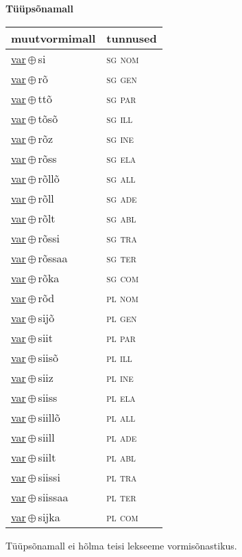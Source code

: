 

\vspace{3.5em}
\noindent \begin{minipage}{\textwidth}
\noindent \textbf{Tüüpsõnamall \,}\\

\begin{sideways}
\begin{tabular}{l l}
muutvormimall & tunnused \\
\hline
\underline{var}\,$\oplus$\,si & \textsc{ sg nom } \\
\underline{var}\,$\oplus$\,rõ & \textsc{ sg gen } \\
\underline{var}\,$\oplus$\,ttõ & \textsc{ sg par } \\
\underline{var}\,$\oplus$\,tõsõ & \textsc{ sg ill } \\
\underline{var}\,$\oplus$\,rõz & \textsc{ sg ine } \\
\underline{var}\,$\oplus$\,rõss & \textsc{ sg ela } \\
\underline{var}\,$\oplus$\,rõllõ & \textsc{ sg all } \\
\underline{var}\,$\oplus$\,rõll & \textsc{ sg ade } \\
\underline{var}\,$\oplus$\,rõlt & \textsc{ sg abl } \\
\underline{var}\,$\oplus$\,rõssi & \textsc{ sg tra } \\
\underline{var}\,$\oplus$\,rõssaa & \textsc{ sg ter } \\
\underline{var}\,$\oplus$\,rõka & \textsc{ sg com } \\
\underline{var}\,$\oplus$\,rõd & \textsc{ pl nom } \\
\underline{var}\,$\oplus$\,sijõ & \textsc{ pl gen } \\
\underline{var}\,$\oplus$\,siit & \textsc{ pl par } \\
\underline{var}\,$\oplus$\,siisõ & \textsc{ pl ill } \\
\underline{var}\,$\oplus$\,siiz & \textsc{ pl ine } \\
\underline{var}\,$\oplus$\,siiss & \textsc{ pl ela } \\
\underline{var}\,$\oplus$\,siillõ & \textsc{ pl all } \\
\underline{var}\,$\oplus$\,siill & \textsc{ pl ade } \\
\underline{var}\,$\oplus$\,siilt & \textsc{ pl abl } \\
\underline{var}\,$\oplus$\,siissi & \textsc{ pl tra } \\
\underline{var}\,$\oplus$\,siissaa & \textsc{ pl ter } \\
\underline{var}\,$\oplus$\,sijka & \textsc{ pl com } \\
\end{tabular}
\end{sideways}
\label{tab:tüüpsõnamall-varsi}

\end{minipage}

 
\vspace{1em}
\noindent Tüüpsõnamall  ei hõlma teisi lekseeme vormi\-sõnastikus.
